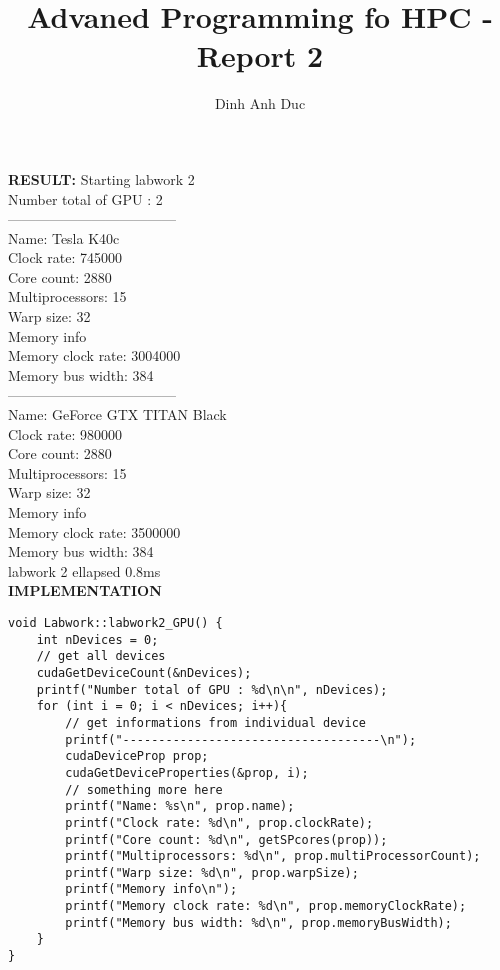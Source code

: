 \documentclass{article}
\title{Advaned Programming fo HPC - Report 2}
\author{Dinh Anh Duc}
\begin{document}
\maketitle

\textbf{RESULT:}
Starting labwork 2
\\
Number total of GPU : 2
\\
------------------------------------
\\
Name: Tesla K40c
\\
Clock rate: 745000
\\
Core count: 2880
\\
Multiprocessors: 15
\\
Warp size: 32
\\
Memory info
\\
Memory clock rate: 3004000
\\
Memory bus width: 384
\\
------------------------------------
\\
Name: GeForce GTX TITAN Black
\\
Clock rate: 980000
\\
Core count: 2880
\\
Multiprocessors: 15
\\
Warp size: 32
\\
Memory info
\\
Memory clock rate: 3500000
\\
Memory bus width: 384
\\
labwork 2 ellapsed 0.8ms
\\
\textbf{IMPLEMENTATION}
\begin{lstlisting}
void Labwork::labwork2_GPU() {
    int nDevices = 0;
    // get all devices
    cudaGetDeviceCount(&nDevices);
    printf("Number total of GPU : %d\n\n", nDevices);
    for (int i = 0; i < nDevices; i++){
        // get informations from individual device
        printf("------------------------------------\n");
        cudaDeviceProp prop;
        cudaGetDeviceProperties(&prop, i);
        // something more here
        printf("Name: %s\n", prop.name);
        printf("Clock rate: %d\n", prop.clockRate);
        printf("Core count: %d\n", getSPcores(prop));
        printf("Multiprocessors: %d\n", prop.multiProcessorCount);
        printf("Warp size: %d\n", prop.warpSize);
        printf("Memory info\n");
        printf("Memory clock rate: %d\n", prop.memoryClockRate);
        printf("Memory bus width: %d\n", prop.memoryBusWidth);
    }
}
\end{lstlisting}
\end{document}
